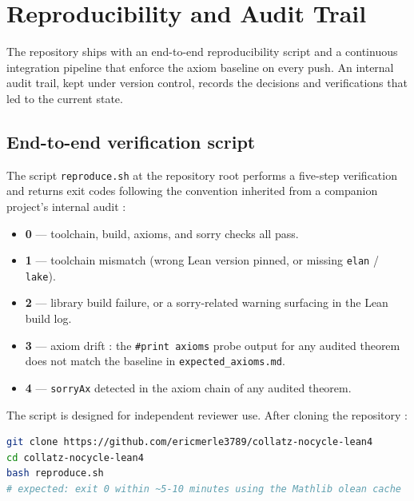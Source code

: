 
\section{Reproducibility and Audit Trail}
\label{sec:reproducibility}

The repository ships with an end-to-end reproducibility script and a
continuous integration pipeline that enforce the axiom baseline on every
push. An internal audit trail, kept under version control, records the
decisions and verifications that led to the current state.

\subsection{End-to-end verification script}

The script \texttt{reproduce.sh} at the repository root performs a
five-step verification and returns exit codes following the convention
inherited from a companion project's internal audit :

\begin{itemize}
  \item \textbf{0} --- toolchain, build, axioms, and sorry checks all pass.
  \item \textbf{1} --- toolchain mismatch (wrong Lean version pinned, or
        missing \texttt{elan} / \texttt{lake}).
  \item \textbf{2} --- library build failure, or a sorry-related warning
        surfacing in the Lean build log.
  \item \textbf{3} --- axiom drift : the \texttt{\#print axioms} probe
        output for any audited theorem does not match the baseline in
        \texttt{expected\_axioms.md}.
  \item \textbf{4} --- \texttt{sorryAx} detected in the axiom chain of any
        audited theorem.
\end{itemize}

The script is designed for independent reviewer use. After cloning the
repository :

\begin{lstlisting}[language=bash]
git clone https://github.com/ericmerle3789/collatz-nocycle-lean4
cd collatz-nocycle-lean4
bash reproduce.sh
# expected: exit 0 within ~5-10 minutes using the Mathlib olean cache
\end{lstlisting}

